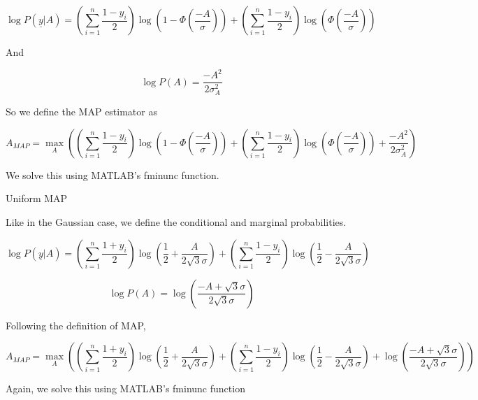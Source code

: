 \documentclass{amsart}
\begin{document}
\begin{equation}
\log P(\underline{y}|A) = \left( \sum_{i=1}^{n}\frac{1-y_i}{2} \right) \log(1-\Phi(\frac{-A}{\sigma})) + \left( \sum_{i=1}^{n}\frac{1-y_i}{2} \right)  \log(\Phi(\frac{-A}{\sigma}))
\end{equation}

And

\begin{equation}
\log P(A) = \frac{-A^2}{2\sigma_{A}^2}
\end{equation}

So we define the MAP estimator as

\begin{equation}
A_{MAP} = \max_{A}\left( \left( \sum_{i=1}^{n}\frac{1-y_i}{2} \right) \log(1-\Phi(\frac{-A}{\sigma})) + \left( \sum_{i=1}^{n}\frac{1-y_i}{2} \right)  \log(\Phi(\frac{-A}{\sigma})) + \frac{-A^2}{2\sigma_{A}^2} \right)
\end{equation}

We solve this using MATLAB's fminunc function.

\newpage

Uniform MAP

Like in the Gaussian case, we define the conditional and marginal probabilities.

\begin{equation}
\log P(\underline{y}|A) = \left(\sum_{i=1}^{n}\frac{1+y_i}{2}\right)\log\left( \frac{1}{2} + \frac{A}{2\sqrt{3}\sigma} \right) + \left(\sum_{i=1}^{n}\frac{1-y_i}{2}\right)\log\left( \frac{1}{2} - \frac{A}{2\sqrt{3}\sigma} \right)
\end{equation}

\begin{equation}
\log P(A) = \log(\frac{-A + \sqrt{3}\sigma}{2\sqrt{3}\sigma})
\end{equation}

Following the definition of MAP,

\begin{equation}
A_{MAP} = \max_{A} \left( \left(\sum_{i=1}^{n}\frac{1+y_i}{2}\right)\log\left( \frac{1}{2} + \frac{A}{2\sqrt{3}\sigma} \right) + \left(\sum_{i=1}^{n}\frac{1-y_i}{2}\right)\log\left( \frac{1}{2} - \frac{A}{2\sqrt{3}\sigma} \right) + \log(\frac{-A + \sqrt{3}\sigma}{2\sqrt{3}\sigma}) \right)
\end{equation}

Again, we solve this using MATLAB's fminunc function
\end{document}
